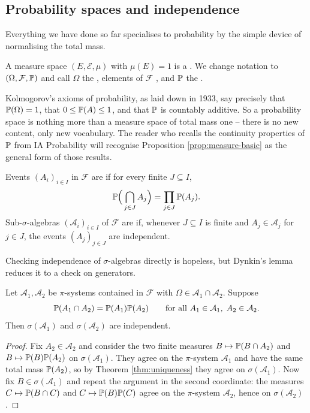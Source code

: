 \documentclass[a4paper]{scrartcl}
\newcommand{\cA}{\mathcal{A}}
\newcommand{\cE}{\mathcal{E}}
\newcommand{\cF}{\mathcal{F}}
\begin{document}
\subsection{Probability spaces and independence}

Everything we have done so far specialises to probability by the simple device of normalising the total mass.

\begin{definition}
	A measure space $(E, \cE, \mu)$ with $\mu(E) = 1$ is a . We change notation to $(\Omega, \cF, \PP)$ and call $\Omega$ the , elements of $\cF$ , and $\mathbb{P}$ the .
\end{definition}

Kolmogorov's axioms of probability, as laid down in 1933, say precisely that $\mathbb{P}(\Omega)=1$, that $0 \leq \mathbb{P}(A) \leq 1$, and that $\mathbb{P}$ is countably additive. So a probability space is nothing more than a measure space of total mass one -- there is no new content, only new vocabulary. The reader who recalls the continuity properties of $\mathbb{P}$ from IA Probability will recognise Proposition \ref{prop:measure-basic} as the general form of those results.

\begin{definition}[Independence]
	Events $(A_i)_{i \in I}$ in $\cF$ are  if for every finite $J \subseteq I$,
	$$
	\mathbb{P}\Big( \bigcap_{j\in J} A_j \Big) = \prod_{j \in J} \mathbb{P}(A_j).
	$$
	Sub-$\sigma$-algebras $(\cA_i)_{i \in I}$ of $\cF$ are  if, whenever $J \subseteq I$ is finite and $A_j \in \cA_j$ for $j \in J$, the events $(A_j)_{j \in J}$ are independent.
\end{definition}

Checking independence of $\sigma$-algebras directly is hopeless, but Dynkin's lemma reduces it to a check on generators.

\begin{proposition}\label{prop:indep-pi}
	Let $\cA_1, \cA_2$ be $\pi$-systems contained in $\cF$ with $\Omega \in \cA_1 \cap \cA_2$. Suppose
	$$
	\PP(A_1 \cap A_2) = \PP(A_1)\PP(A_2) \qquad \text{for all } A_1 \in \cA_1, \; A_2 \in \cA_2.
	$$
	Then $\sigma(\cA_1)$ and $\sigma(\cA_2)$ are independent.
\end{proposition}
\begin{proof}
	Fix $A_2 \in \cA_2$ and consider the two finite measures $B \mapsto \mathbb{P}(B \cap A_2)$ and $B \mapsto \mathbb{P}(B)\mathbb{P}(A_2)$ on $\sigma(\cA_1)$. They agree on the $\pi$-system $\cA_1$ and have the same total mass $\mathbb{P}(A_2)$, so by Theorem \ref{thm:uniqueness} they agree on $\sigma(\cA_1)$. Now fix $B \in \sigma(\cA_1)$ and repeat the argument in the second coordinate: the measures $C \mapsto \mathbb{P}(B \cap C)$ and $C \mapsto \mathbb{P}(B)\mathbb{P}(C)$ agree on the $\pi$-system $\cA_2$, hence on $\sigma(\cA_2)$.
\end{proof}
\end{document}
